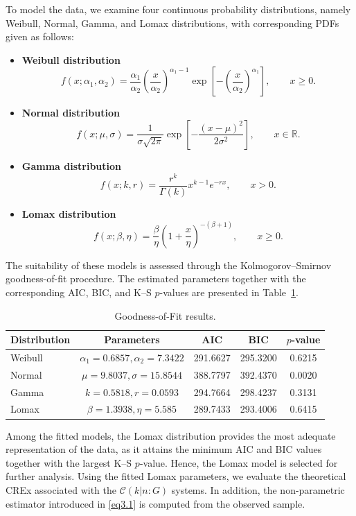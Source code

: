 \documentclass[12pt,a4paper]{article}
\numberwithin{equation}{section}
\begin{document}
To model the data, we examine four continuous probability distributions, namely Weibull, Normal, Gamma, and Lomax distributions, with corresponding PDFs given as follows:
\begin{itemize}
\item \textbf{Weibull distribution}
$$
f(x;\alpha_1,\alpha_2)=\frac{\alpha_1}{\alpha_2}
\left(\frac{x}{\alpha_2}\right)^{\alpha_1-1}
\exp\left[-\left(\frac{x}{\alpha_2}\right)^{\alpha_1}\right],
\qquad x\geq 0.
$$
\item \textbf{Normal distribution}
$$
f(x;\mu,\sigma)=\frac{1}{\sigma\sqrt{2\pi}}
\exp\left[-\frac{(x-\mu)^2}{2\sigma^2}\right],
\qquad x\in\mathbb{R}.
$$
\item \textbf{Gamma distribution}
$$
f(x;k,r)=\frac{r^k}{\Gamma(k)}x^{k-1}e^{-rx},
\qquad x>0.
$$
\item \textbf{Lomax distribution}
$$
f(x;\beta,\eta)=\frac{\beta}{\eta}
\left(1+\frac{x}{\eta}\right)^{-(\beta+1)},
\qquad x\geq 0.
$$
\end{itemize}

The suitability of these models is assessed through the Kolmogorov--Smirnov goodness-of-fit procedure. The estimated parameters together with the corresponding AIC, BIC, and K--S $p$-values are presented in Table~\ref{tab:fit}.
\begin{table}[H] \centering \caption{Goodness-of-Fit results.} \label{tab:fit} \begin{tabular}{lcccc} \toprule \textbf{Distribution} & \textbf{Parameters} & \textbf{AIC} & \textbf{BIC} & \textbf{$p$-value} \\ \midrule Weibull & $\alpha_1=0.6857,\alpha_2=7.3422$ & 291.6627 & 295.3200 & 0.6215 \\ Normal & $\mu=9.8037,\sigma=15.8544$ & 388.7797 & 392.4370 & 0.0020 \\ Gamma & $k=0.5818,r=0.0593$ & 294.7664 & 298.4237 & 0.3131 \\ Lomax & $\beta=1.3938,\eta=5.585$ & 289.7433 & 293.4006 & 0.6415 \\ \bottomrule \end{tabular} \end{table}
Among the fitted models, the Lomax distribution provides the most adequate representation of the data, as it attains the minimum AIC and BIC values together with the largest K--S $p$-value. Hence, the Lomax model is selected for further analysis.
Using the fitted Lomax parameters, we evaluate the theoretical CREx associated with the $\mathcal C(k|n{:}G)$ systems. In addition, the non-parametric estimator introduced in \eqref{eq3.1} is computed from the observed sample.
\end{document}
